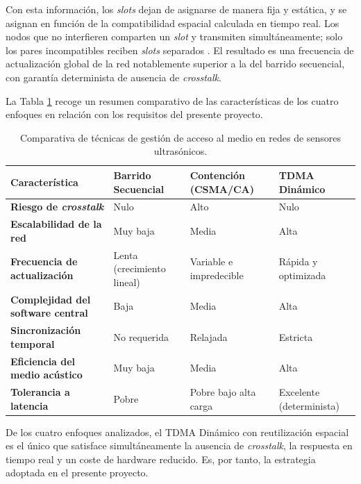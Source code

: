 Con esta información, los \textit{slots} dejan de asignarse de manera fija y estática, y se asignan en función de la compatibilidad espacial calculada en tiempo real. Los nodos que no interfieren comparten un \textit{slot} y transmiten simultáneamente; solo los pares incompatibles reciben \textit{slots} separados \cite{16,17}. El resultado es una frecuencia de actualización global de la red notablemente superior a la del barrido secuencial, con garantía determinista de ausencia de \textit{crosstalk}.

La Tabla \ref{tab:comparativa_acceso} recoge un resumen comparativo de las características de los cuatro enfoques en relación con los requisitos del presente proyecto.

\begin{table}[H]
\centering
\begin{tabularx}{\textwidth}{p{3.4cm} X X X}
    \toprule
    \textbf{Característica} & \textbf{Barrido Secuencial} & \textbf{Contención (CSMA/CA)} & \textbf{TDMA Dinámico} \\
    \midrule
    \textbf{Riesgo de \textit{crosstalk}} & Nulo & Alto & Nulo \\
    \addlinespace
    \textbf{Escalabilidad de la red} & Muy baja & Media & Alta \\
    \addlinespace
    \textbf{Frecuencia de actualización} & Lenta (crecimiento lineal) & Variable e impredecible & Rápida y optimizada \\
    \addlinespace
    \textbf{Complejidad del software central} & Baja & Media & Alta \\
    \addlinespace
    \textbf{Sincronización temporal} & No requerida & Relajada & Estricta \\
    \addlinespace
    \textbf{Eficiencia del medio acústico} & Muy baja & Media & Alta \\
    \addlinespace
    \textbf{Tolerancia a latencia} & Pobre & Pobre bajo alta carga & Excelente (determinista) \\
    \bottomrule
\end{tabularx}
\caption{Comparativa de técnicas de gestión de acceso al medio en redes de sensores ultrasónicos.}
\label{tab:comparativa_acceso}
\end{table}

De los cuatro enfoques analizados, el TDMA Dinámico con reutilización espacial es el único que satisface simultáneamente la ausencia de \textit{crosstalk}, la respuesta en tiempo real y un coste de hardware reducido. Es, por tanto, la estrategia adoptada en el presente proyecto.

